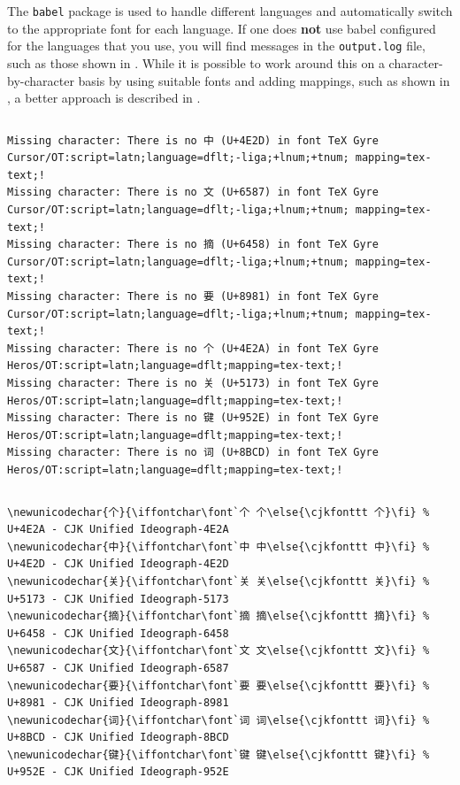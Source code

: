 \documentclass[12pt, twoside]{article}
\newcommand{\fname}[1]{\texttt{#1}}
\begin{document}
The \texttt{babel} package is used to handle different languages and automatically switch to the appropriate font for each language. 
If one does \textbf{not} use babel configured for the languages that you use, you will find messages in the \fname{output.log} file, such as those shown in . While it is possible to work around this on a character-by-character basis by using suitable fonts and adding mappings, such as shown in , a better approach is described in .


\begin{lstlisting}[style=latexExampleForAuthors,  escapechar=|, 
basicstyle=\footnotesize,
caption={Examples of missing characters from the output.log file},
label=lst:missingCharactersFromLogExample]
\end{lstlisting}
\begin{Verbatim}[breaklines=true]
Missing character: There is no 中 (U+4E2D) in font TeX Gyre Cursor/OT:script=latn;language=dflt;-liga;+lnum;+tnum; mapping=tex-text;!
Missing character: There is no 文 (U+6587) in font TeX Gyre Cursor/OT:script=latn;language=dflt;-liga;+lnum;+tnum; mapping=tex-text;!
Missing character: There is no 摘 (U+6458) in font TeX Gyre Cursor/OT:script=latn;language=dflt;-liga;+lnum;+tnum; mapping=tex-text;!
Missing character: There is no 要 (U+8981) in font TeX Gyre Cursor/OT:script=latn;language=dflt;-liga;+lnum;+tnum; mapping=tex-text;!
Missing character: There is no 个 (U+4E2A) in font TeX Gyre Heros/OT:script=latn;language=dflt;mapping=tex-text;!
Missing character: There is no 关 (U+5173) in font TeX Gyre Heros/OT:script=latn;language=dflt;mapping=tex-text;!
Missing character: There is no 键 (U+952E) in font TeX Gyre Heros/OT:script=latn;language=dflt;mapping=tex-text;!
Missing character: There is no 词 (U+8BCD) in font TeX Gyre Heros/OT:script=latn;language=dflt;mapping=tex-text;!
\end{Verbatim}


\begin{lstlisting}[style=latexExampleForAuthors,  escapechar=|, 
caption={Examples of new unicode character definitions},
label=lst:newunicodeForAbstracts]
\end{lstlisting}
\begin{Verbatim}[breaklines=true]
\newunicodechar{个}{\iffontchar\font`个 个\else{\cjkfonttt 个}\fi} % U+4E2A - CJK Unified Ideograph-4E2A
\newunicodechar{中}{\iffontchar\font`中 中\else{\cjkfonttt 中}\fi} % U+4E2D - CJK Unified Ideograph-4E2D
\newunicodechar{关}{\iffontchar\font`关 关\else{\cjkfonttt 关}\fi} % U+5173 - CJK Unified Ideograph-5173
\newunicodechar{摘}{\iffontchar\font`摘 摘\else{\cjkfonttt 摘}\fi} % U+6458 - CJK Unified Ideograph-6458
\newunicodechar{文}{\iffontchar\font`文 文\else{\cjkfonttt 文}\fi} % U+6587 - CJK Unified Ideograph-6587
\newunicodechar{要}{\iffontchar\font`要 要\else{\cjkfonttt 要}\fi} % U+8981 - CJK Unified Ideograph-8981
\newunicodechar{词}{\iffontchar\font`词 词\else{\cjkfonttt 词}\fi} % U+8BCD - CJK Unified Ideograph-8BCD
\newunicodechar{键}{\iffontchar\font`键 键\else{\cjkfonttt 键}\fi} % U+952E - CJK Unified Ideograph-952E
\end{Verbatim}
\end{document}
